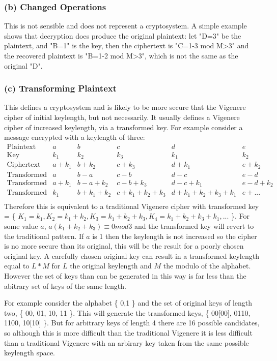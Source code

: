 \documentclass{book}%
\begin{document}
\subsubsection*{(b) Changed Operations}
This is not sensible and does not represent a cryptosystem. A simple example shows that decryption does produce the original plaintext: let "D=3" be the plaintext, and "B=1" is the key, then the ciphertext is "C=1-3 mod M>3" and the recovered plaintext is "B=1-2 mod M>3", which is not the same as the original "D".
\subsubsection*{(c) Transforming Plaintext}
This defines a cryptosystem and is likely to be more secure that the Vigenere cipher of initial keylength, but not necessarily. It usually defines a Vigenere cipher of increased keylength, via a transformed key. For example consider a message encrypted with a keylength of three:
\[ \begin{matrix}
\text{Plaintext} & a & b & c & d & e \\
\text{Key} & k_1 & k_2 & k_3 & k_1 & k_2 \\
\text{Ciphertext} & a+k_1 & b+k_2 & c+k_3 & d +k_1 & e+k_2 \\
\text{Transformed Plaintext} & a & b-a & c-b & d-c & e-d \\
\text{Transformed Ciphertext} & a+k_1 & b-a+k_2 & c-b+k_3 & d-c+k_1 & e-d+k_2 \\
\text{Transformed Key} & k_1 & b + k_1 + k_2 & c + k_1 + k_2 + k_3 & d+ k_1 + k_2 + k_3 +k_1& e + ...\\
\end{matrix} \]
Therefore this is equivalent to a traditional Vigenere cipher with transformed key = \{ \(K_1=k_1, K_2=k_1+k_2, K_3=k_1+k_2+k_3, K_4=k_1+k_2+k_3 + k_1, ... \) \}. For some value \(a\), \(a(k_1 + k_2 + k_3) \equiv 0 mod 3\) and the transformed key will revert to the traditional pattern. If \(a\) is 1 then the keylength is not increased so the cipher is no more secure than its original, this will be the result for a poorly chosen original key.
A carefully chosen original key can result in a transformed keylength equal to \(L * M\) for \(L\) the original keylength and \(M\) the modulo of the alphabet. However the set of keys than can be generated in this way is far less than the abitrary set of keys of the same length.
\par For example consider the alphabet \{ 0,1 \} and the set of original keys of length two, \{ 00, 01, 10, 11 \}. This will generate the transformed keys, \{ 00[00], 0110, 1100, 10[10] \}. But for arbitrary keys of length 4 there are 16 possible candidates, so although this is more difficult than the traditional Vigenere it is less difficult than a traditional Vigenere with an arbirary key taken from the same possible keylength space.
\end{document}
